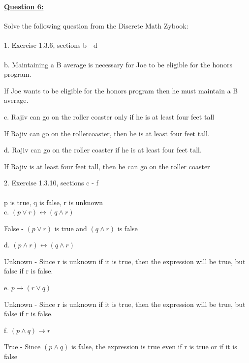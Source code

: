 \documentclass[11pt]{article}
\begin{document}
{\noindent \textbf{\ul{Question 6:}} \\
\\
Solve the following question from the Discrete Math Zybook:\\\\
1. Exercise 1.3.6, sections b - d \\\\
b. Maintaining a B average is necessary for Joe to be eligible for the honors program.\\
\begin{center}
 If Joe wants to be eligible for the honors program then he must maintain a B average. 
\end{center}
c. Rajiv can go on the roller coaster only if he is at least four feet tall \\
\begin{center}
 If Rajiv can go on the rollercoaster, then he is at least four feet tall.
\end{center}
d. Rajiv can go on the roller coaster if he is at least four feet tall. \\
\begin{center}
 If Rajiv is at least four feet tall, then he can go on the roller coaster 
\end{center}

2. Exercise 1.3.10, sections c - f \\\\
p is true, q is false, r is unknown \\
c. $( p \vee r) \leftrightarrow (q \wedge r) $\\
\begin{center}
False - $(p \vee r)$ is true and $(q \wedge r)$ is false
\end{center}
d. $(p\wedge r) \leftrightarrow (q \wedge r) $\\
\begin{center}
Unknown - Since r is unknown if it is true, then the expression will be true, but false if r is false.
\end{center}
e. $ p \rightarrow (r \vee q) $\\
\begin{center}
Unknown - Since r is unknown if it is true, then the expression will be true, but false if r is false.
\end{center}
f. $(p \wedge q) \rightarrow r $\\
\begin{center}
True - Since $(p \wedge q)$ is false, the expression is true even if r is true or if it is false
\end{center}
\pagebreak

}
\end{document}
